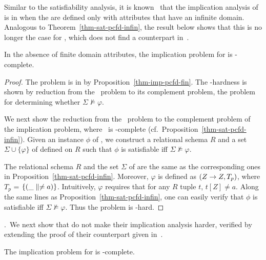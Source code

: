 Similar to the satisfiability analysis,
it is known~\cite{CFDs} that the implication analysis of
\CFDs is in \PTIME when the \CFDs are defined only with attributes that
have an infinite domain. Analogous to Theorem~\ref{thm-sat-pcfd-infin},
the result below shows that this is no longer the case for \pCFDs,
which does not find a counterpart in~\cite{CFDs}.

\begin{prop}
\label{thm-imp-pcfd-infin} In the absence of finite domain
attributes, the implication problem for \pCFDs is
\coNP-complete. 
\end{prop}


\begin{proof}
The problem is in \coNP by
Proposition~\ref{thm-imp-pcfd-fin}. The \coNP-hardness is shown
by reduction from the \kSAT\ problem to its complement problem, \ie
the problem for determining whether $\Sigma\not\models\varphi$.


We next show the reduction from the \kSAT\ problem to the complement
problem of the implication problem, where \kSAT\ is \NP-complete
(cf.~Proposition~\ref{thm-sat-pcfd-infin}). Given an instance $\phi$
of \kSAT, we construct a relational schema $R$ and a set
$\Sigma\cup\{\varphi\}$ of \pCFDs defined on $R$ such that $\phi$
is satisfiable iff $\Sigma\not\models\varphi$.


The relational schema $R$ and the set $\Sigma$ of \pCFDs are the same
as the corresponding ones in Proposition~\ref{thm-sat-pcfd-infin}.
Moreover, $\varphi$ is defined as $(Z \rightarrow Z, T_p)$, where $T_{p}$ =
$\{(\_ \parallel \ne a)\}$. Intuitively, $\varphi$ requires that for any
$R$ tuple $t$, $t[Z] \ne a$. Along the same lines as
Proposition~\ref{thm-sat-pcfd-infin}, one can easily verify that
$\phi$ is satisfiable iff $\Sigma\not\models\varphi$. Thus the
problem is \coNP-hard. 
\end{proof}




.~We next show that \pCINDs
do not make their implication analysis harder, verified by extending the proof of
their \CINDs counterpart given in~\cite{CINDs}.

\begin{prop}
\label{thm-imp-pcind-fin}The implication problem for \pCINDs is
\EXPTIME-complete.
\end{prop}




